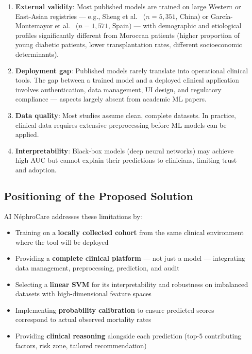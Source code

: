 \documentclass[12pt,a4paper,twoside]{report}
\begin{document}
\begin{enumerate}
  \item \textbf{External validity}: Most published models are trained on large Western or East-Asian registries — e.g., Sheng et al.\ \cite{sheng2020} ($n = 5{,}351$, China) or Garc\'ia-Montemayor et al.\ \cite{garcia2021} ($n = 1{,}571$, Spain) — with demographic and etiological profiles significantly different from Moroccan patients (higher proportion of young diabetic patients, lower transplantation rates, different socioeconomic determinants).
  \item \textbf{Deployment gap}: Published models rarely translate into operational clinical tools. The gap between a trained model and a deployed clinical application involves authentication, data management, UI design, and regulatory compliance — aspects largely absent from academic ML papers.
  \item \textbf{Data quality}: Most studies assume clean, complete datasets. In practice, clinical data requires extensive preprocessing before ML models can be applied.
  \item \textbf{Interpretability}: Black-box models (deep neural networks) may achieve high AUC but cannot explain their predictions to clinicians, limiting trust and adoption.
\end{enumerate}

\subsection{Positioning of the Proposed Solution}

AI NéphroCare addresses these limitations by:
\begin{itemize}
  \item Training on a \textbf{locally collected cohort} from the same clinical environment where the tool will be deployed
  \item Providing a \textbf{complete clinical platform} — not just a model — integrating data management, preprocessing, prediction, and audit
  \item Selecting a \textbf{linear SVM} for its interpretability and robustness on imbalanced datasets with high-dimensional feature spaces
  \item Implementing \textbf{probability calibration} to ensure predicted scores correspond to actual observed mortality rates
  \item Providing \textbf{clinical reasoning} alongside each prediction (top-5 contributing factors, risk zone, tailored recommendation)
\end{itemize}
\end{document}
